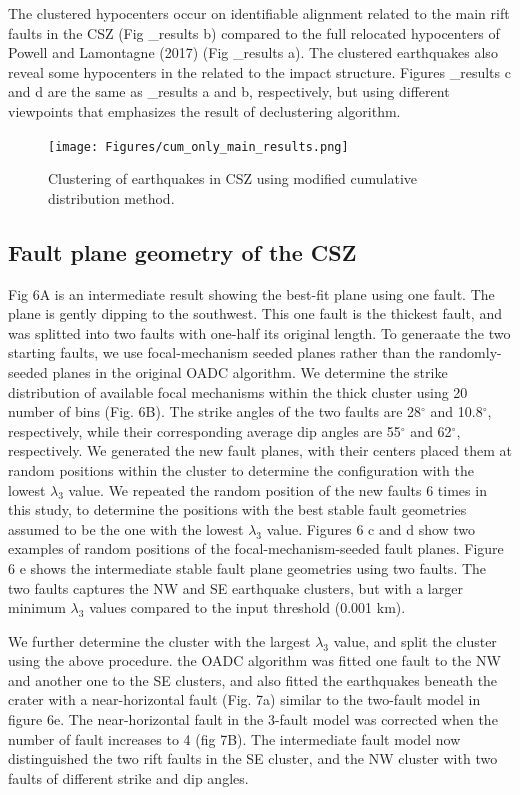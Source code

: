 \documentclass[draft]{agujournal2018}
\begin{document}
The clustered hypocenters occur on identifiable alignment related to the main rift faults in the CSZ (Fig \cum_results b) compared to the full relocated hypocenters of Powell and Lamontagne (2017) (Fig \cum_results a). The clustered earthquakes also reveal some hypocenters in the related to the impact structure. Figures \cum_results c and d are the same as \cum_results a and b, respectively, but using different viewpoints that emphasizes the result of declustering algorithm.

\begin{figure}[ht]
\centering
\texttt{[image: Figures/cum\_only\_main\_results.png]}
\caption{Clustering of earthquakes in CSZ using modified cumulative distribution method.}
\label{figtwo}
\end{figure}
  
 
\subsection{Fault plane geometry of the CSZ}
Fig 6A is an intermediate result showing the best-fit plane using one fault. The plane is gently dipping to the southwest. This one fault is the thickest fault, and was splitted into two faults with one-half its original length. To generaate the two starting faults, we use focal-mechanism seeded planes rather than the randomly-seeded planes in the original OADC algorithm. We determine the strike distribution of available focal mechanisms within the thick cluster using 20 number of bins (Fig. 6B). The strike angles of the two faults are 28$^\circ$ and 10.8$^\circ$, respectively, while their corresponding average dip angles are 55$^\circ$ and 62$^\circ$, respectively. We generated the new fault planes, with their centers placed them at random positions within the cluster to determine the configuration with the lowest $\lambda_3$ value. We repeated the random position of the new faults 6 times in this study, to determine the positions with the best stable fault geometries assumed to be the one with the lowest $\lambda_3$ value. Figures 6 c and d show two examples of random positions of the focal-mechanism-seeded fault planes. Figure 6 e shows the intermediate stable fault plane geometries using two faults. The two faults captures the NW and SE earthquake clusters, but with a larger minimum $\lambda_3$ values compared to the input threshold (0.001 km).

We further determine the cluster with the largest $\lambda_3$ value, and split the cluster using the above procedure. the OADC algorithm was fitted one fault to the NW and another one to the SE clusters, and also fitted the earthquakes beneath the crater with a near-horizontal fault (Fig. 7a) similar to the two-fault model in figure 6e. The near-horizontal fault in the 3-fault model was corrected when the number of fault increases to 4 (fig 7B). The intermediate fault model now distinguished the two rift faults in the SE cluster, and the NW cluster with two faults of different strike and dip angles. 
\end{document}
